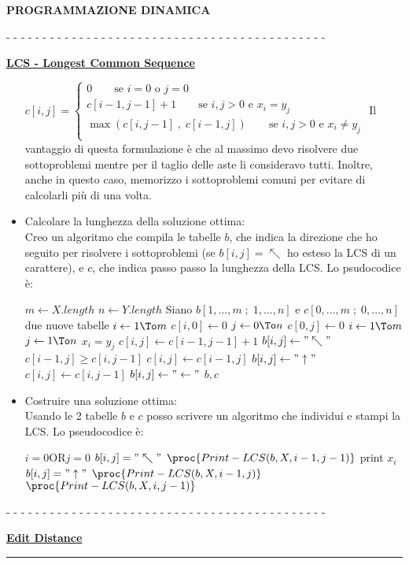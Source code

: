 \documentclass[8pt]{extarticle}
\newenvironment{formulario}
{
\setlength{\columnsep}{3em}
\twocolumn
\lstset{tabsize=3}
\begin{spacing}{1}
\begin{flushleft}
}{
\end{flushleft}
\end{spacing}
}
\newenvironment{tcenter}{
  \par
  \centering
  \setlength{\parskip}{0pt} %
  \noindent
}{
  \par
}
\newenvironment{code}[1]
{
\begin{codebox}
\Procname{$#1$}
}{
\end{codebox}
}
\newenvironment{myParagraph}[1]
{
\begin{tcenter}
\textbf{#1}
\end{tcenter}
}{
\myRule
}
\newenvironment{subParagraph}[1]
{
\dashrule
\begin{tcenter}
\bo{\underline{#1}}\\
\end{tcenter}
}{}
\newcommand{\myRule}{\rule{250pt}{0.1pt}}
\newcommand{\bo}[1]{\textbf{#1}}
\newcommand{\la}{\leftarrow}
\newcommand{\dashrule}{\begin{tcenter}- - - - - - - - - - - - - - - - - - - - - - - - - - - - - - - - - - - - - - - - - - - - \; \end{tcenter}}
\newcommand{\FOR}[1]{\For $#1$ \Do}
\newcommand{\IF}[1]{\If $#1$ \Then}
\newcommand{\ELSEIF}[1]{\ElseIf $#1$\Then}
\newcommand{\ELSE}{\Else}
\newcommand{\RETURN}{\Return}
\newcommand{\END}{\End}
\newcommand{\get}{\la}
\newcommand{\TO}{\To}
\begin{document}
\begin{formulario}
\begin{myParagraph}{PROGRAMMAZIONE DINAMICA}
\begin{subParagraph}{LCS - Longest Common Sequence}
\begin{itemize}
\small{$c[i,j]=		
\begin{cases}
		0 \qquad \text{se } i=0 \text{ o } j=0 \\
		c[i-1,j-1]+1 \qquad \text{se } i,j>0 \text{ e } x_i=y_j \\
		\max (c[i,j-1]\;,\;c[i-1,j]) \qquad \text{se } i,j>0 \text{ e } x_i \neq y_j \\
\end{cases}$}
Il vantaggio di questa formulazione è che al massimo devo risolvere due sottoproblemi mentre per il taglio delle aste li consideravo tutti. Inoltre, anche in questo caso, memorizzo i sottoproblemi comuni per evitare di calcolarli più di una volta.
		\item Calcolare la lunghezza della soluzione ottima:\\
Creo un algoritmo che compila le tabelle $b$, che indica la direzione che ho seguito per risolvere i sottoproblemi (se $b[i,j]=\nwarrow$ ho esteso la LCS di un carattere), e $c$, che indica passo passo la lunghezza della LCS. Lo psudocodice è:
				\begin{code}{LCS-Length(X,Y)}
\li $m \get X.length$
\li $n \get Y.length$
\li Siano $b[1,...,m\; ; \;1,...,n] \text{ e } c[0,...,m\; ; \;0,...,n]$ due nuove tabelle
\li \FOR{i \get 1 \TO  m}
	\li $c[i,0] \get 0$
\END
\li \FOR{j \get 0 \TO  n}
	\li $c[0,j] \get 0$
\END
\li \FOR{i \get 1 \TO m}
	\li \FOR{j \get 1 \TO n}
		\li \IF{x_i = y_j}
			\li $c[i,j] \get c[i-1,j-1]+1$
			\li $b[i,j] \get "\nwarrow"$
		\li \ELSEIF{c[i-1,j] \geq c[i,j-1]}
			\li $c[i,j] \get c[i-1,j]$
			\li $b[i,j] \get "\uparrow"$
		\li \ELSE
			\li $c[i,j] \get c[i,j-1]$
			\li $b[i,j] \get "\la"$
		\END
	\END
\END
\li \RETURN $b,c$
				\end{code}
		\item Costruire una soluzione ottima:\\
Usando le 2 tabelle $b$ e $c$ posso scrivere un algoritmo che individui e stampi la LCS. Lo pseudocodice è:
				\begin{code}{Print-LCS(b,X,i,j)}
\li \IF{i=0 \text{OR} j=0}
	\li \RETURN
\END
\li \IF{b[i,j]="\nwarrow"}
	\li $\proc{Print-LCS(b,X,i-1,j-1)}$
	\li print $x_i$
\li \ELSEIF{b[i,j]="\uparrow"}
	\li $\proc{Print-LCS(b,X,i-1,j)}$
\li \ELSE
	\li $\proc{Print-LCS(b,X,i,j-1)}$
\END
				\end{code}
			\end{itemize}
		\end{subParagraph}

		\begin{subParagraph}{Edit Distance}
		\end{subParagraph}
	

\end{myParagraph}
\end{formulario}
\end{document}
